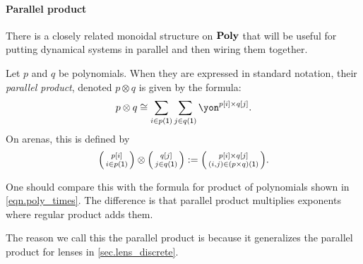 \documentclass[DynamicalBook]{subfiles}
\begin{document}
\paragraph{Parallel product}
There is a closely related monoidal structure on $\textbf{Poly}$ that will be useful for putting dynamical systems in parallel and then wiring them together.

\begin{definition}\label{def.dirichlet}
Let $p$ and $q$ be polynomials. When they are expressed in standard notation, their \emph{parallel product}, denoted $p\otimes q$ is given by the formula:
\begin{equation}\label{eqn.dirichlet_def}
p\otimes q\cong\sum_{i\in p(\1)}\sum_{j\in q(\1)}\yon^{p[i]\times q[j]}.
\end{equation}
On arenas, this is defined by
\begin{equation}\label{eqn.parallel_product_dependent}
\lens{p[i]}{i \in p(\1)} \otimes \lens{q[j]}{j \in q(\1)} := \lens{p[i] \times q[j]}{(i,j) \in (p \times q)(\1)}.
\end{equation}
\end{definition}

One should compare this with the formula for product of polynomials shown in \eqref{eqn.poly_times}. The difference is that parallel product multiplies exponents where regular product adds them.

\begin{remark}
  The reason we call this the parallel product is because it generalizes the
  parallel product for lenses in \cref{sec.lens_discrete}.
\end{remark}
\end{document}
